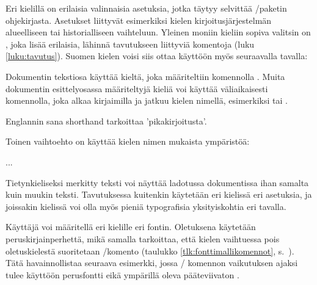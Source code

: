 \begin{koodilohkosis}
\usepackage{polyglossia}
\setdefaultlanguage{finnish}
\end{koodilohkosis}

Eri kielillä on erilaisia valinnaisia asetuksia, jotka täytyy selvittää
\-/paketin ohjekirjasta. Asetukset liittyvät
esimerkiksi kielen kirjoitusjärjestelmän alueelliseen tai
historialliseen vaihteluun. Yleinen moniin kieliin sopiva valitsin on
, joka lisää erilaisia, lähinnä tavutukseen
liittyviä komentoja (luku \ref{luku:tavutus}). Suomen kielen voisi siis
ottaa käyttöön myös seuraavalla tavalla:

\begin{koodilohkosis}
\setdefaultlanguage[babelshorthands]{finnish}
\end{koodilohkosis}

Dokumentin tekstiosa käyttää kieltä, joka määriteltiin komennolla
. Muita dokumentin esittelyosassa
määriteltyjä kieliä voi käyttää väliaikaisesti komennolla, joka alkaa
kirjaimilla  ja jatkuu kielen nimellä, esimerkiksi
 tai .

\begin{koodilohkosis}
Englannin sana \textenglish{shorthand} tarkoittaa 'pikakirjoitusta'.
\end{koodilohkosis}

Toinen vaihtoehto on käyttää kielen nimen mukaista ympäristöä:

\begin{koodilohkosis}
\begin{greek}
  ...
\end{greek}
\end{koodilohkosis}

Tietynkieliseksi merkitty teksti voi näyttää ladotussa dokumentissa ihan
samalta kuin muukin teksti. Tavutuksessa kuitenkin käytetään eri
kielissä eri asetuksia, ja joissakin kielissä voi olla myös pieniä
typografisia yksityiskohtia eri tavalla.

Käyttäjä voi määritellä eri kielille eri fontin. Oletuksena käytetään
peruskirjainperhettä, mikä samalla tarkoittaa, että kielen vaihtuessa
pois oletuskielestä suoritetaan \-/komento (taulukko
\ref{tlk:fonttimallikomennot}, s.~\pageref{tlk:fonttimallikomennot}).
Tätä havainnollistaa seuraava esimerkki, jossa \-/
komennon vaikutuksen ajaksi tulee käyttöön perusfontti
 eikä ympärillä oleva pääteviivaton
.

